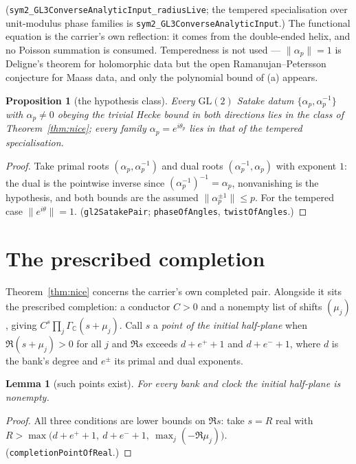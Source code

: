\documentclass[11pt]{article}
\newtheorem{lemma}[theorem]{Lemma}
\newtheorem{proposition}[theorem]{Proposition}
\newcommand{\Gm}{\Gamma_{\mathbb C}}
\begin{document}
\noindent(\texttt{sym2\_GL3ConverseAnalyticInput\_radiusLive}; the tempered specialisation over
unit-modulus phase families is \texttt{sym2\_GL3ConverseAnalyticInput}.) The functional equation
is the carrier's own reflection: it comes from the double-ended helix, and no Poisson summation is
consumed. Temperedness is not used --- $\|\alpha_p\|=1$ is Deligne's theorem for holomorphic data
but the open Ramanujan--Petersson conjecture for Maass data, and only the polynomial bound of (a)
appears.

\begin{proposition}[the hypothesis class]\label{prop:nonvac}
Every $\mathrm{GL}(2)$ Satake datum $\{\alpha_p,\alpha_p^{-1}\}$ with $\alpha_p\ne0$ obeying the
trivial Hecke bound in both directions lies in the class of Theorem~\ref{thm:nice}; every family
$\alpha_p=e^{i\theta_p}$ lies in that of the tempered specialisation.
\end{proposition}
\begin{proof}
Take primal roots $(\alpha_p,\alpha_p^{-1})$ and dual roots $(\alpha_p^{-1},\alpha_p)$ with
exponent $1$: the dual is the pointwise inverse since $(\alpha_p^{-1})^{-1}=\alpha_p$,
nonvanishing is the hypothesis, and both bounds are the assumed $\|\alpha_p^{\pm1}\|\le p$. For
the tempered case $\|e^{i\theta}\|=1$.
(\texttt{gl2SatakePair}; \texttt{phaseOfAngles}, \texttt{twistOfAngles}.)
\end{proof}

\section{The prescribed completion}

Theorem~\ref{thm:nice} concerns the carrier's own completed pair. Alongside it sits the
prescribed completion: a conductor $C>0$ and a nonempty list of shifts $(\mu_j)$, giving
$C^{s}\prod_j\Gm(s+\mu_j)$. Call $s$ a \emph{point of the initial half-plane} when
$\Re(s+\mu_j)>0$ for all $j$ and $\Re s$ exceeds $d+e^{+}+1$ and $d+e^{-}+1$, where $d$ is the
bank's degree and $e^{\pm}$ its primal and dual exponents.

\begin{lemma}[such points exist]\label{lem:point}
For every bank and clock the initial half-plane is nonempty.
\end{lemma}
\begin{proof}
All three conditions are lower bounds on $\Re s$: take $s=R$ real with
$R>\max\bigl(d+e^{+}+1,\ d+e^{-}+1,\ \max_j(-\Re\mu_j)\bigr)$.
(\texttt{completionPointOfReal}.)
\end{proof}
\end{document}
